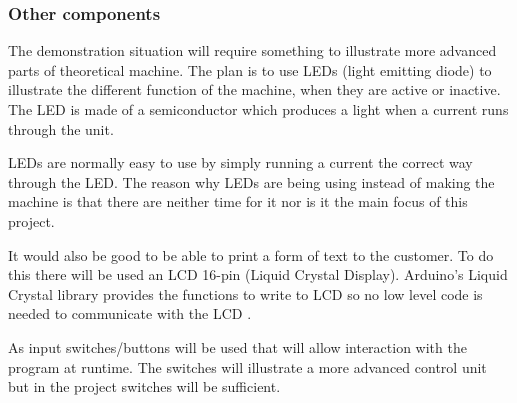 \subsubsection{Other components}
The demonstration situation will require something to illustrate more advanced parts of theoretical machine. The plan is to use LEDs (light emitting diode) to illustrate the different function of the machine, when they are active or inactive. The LED is made of a semiconductor which produces a light when a current runs through the unit.

LEDs are normally easy to use by simply running a current the correct way through the LED.
The reason why LEDs are being using instead of making the machine is that there are neither time for it nor is it the main focus of this project.

It would also be good to be able to print a form of text to the customer. To do this there will be used an LCD 16-pin (Liquid Crystal Display). Arduino's Liquid Crystal library provides the functions to write to LCD so no low level code is needed to communicate with the LCD \citep{ArduinoLCD}.

As input switches/buttons will be used that will allow interaction with the program at runtime. The switches will illustrate a more advanced control unit but in the project switches will be sufficient.